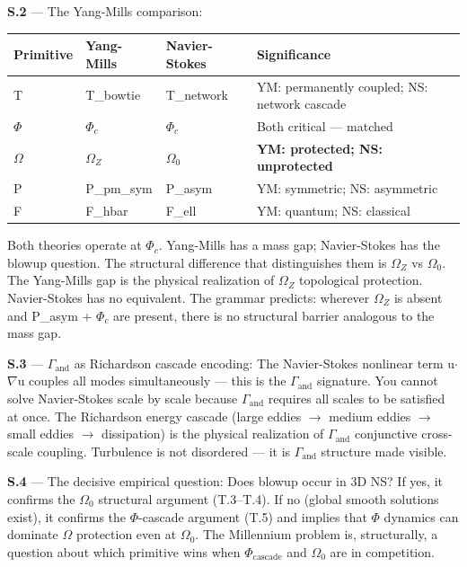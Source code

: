 \documentclass[11pt,a4paper]{article}
\begin{document}
\textbf{S.2} --- The Yang-Mills comparison:

\begin{table}[htbp]
\centering
\small
{}
\begin{tabularx}{\textwidth}{>{\centering\arraybackslash}X >{\centering\arraybackslash}X >{\centering\arraybackslash}X >{\centering\arraybackslash}X}
\toprule
\rowcolor{gray!25}\textbf{Primitive} & \textbf{Yang-Mills} & \textbf{Navier-Stokes} & \textbf{Significance} \\
\midrule
\rowcolors{1}{white}{gray!10}
T & T\_bowtie & T\_network & YM: permanently coupled; NS: network cascade \\
$\Phi$ & $\Phi_c$ & $\Phi_c$ & Both critical --- matched \\
\textbf{$\Omega$} & \textbf{$\Omega_Z$} & \textbf{$\Omega_0$} & \textbf{YM: protected; NS: unprotected} \\
P & P\_pm\_sym & P\_asym & YM: symmetric; NS: asymmetric \\
F & F\_hbar & F\_ell & YM: quantum; NS: classical \\
\bottomrule
\end{tabularx}
\end{table}

Both theories operate at $\Phi_c$. Yang-Mills has a mass gap; Navier-Stokes has the blowup question. The structural difference that distinguishes them is $\Omega_Z$ vs $\Omega_0$. The Yang-Mills gap is the physical realization of $\Omega_Z$ topological protection. Navier-Stokes has no equivalent. The grammar predicts: wherever $\Omega_Z$ is absent and P\_asym + $\Phi_c$ are present, there is no structural barrier analogous to the mass gap.

\textbf{S.3} --- $\Gamma_\text{and}$ as Richardson cascade encoding: The Navier-Stokes nonlinear term u$\cdot$$\nabla$u couples all modes simultaneously --- this is the $\Gamma_\text{and}$ signature. You cannot solve Navier-Stokes scale by scale because $\Gamma_\text{and}$ requires all scales to be satisfied at once. The Richardson energy cascade (large eddies $\to$ medium eddies $\to$ small eddies $\to$ dissipation) is the physical realization of $\Gamma_\text{and}$ conjunctive cross-scale coupling. Turbulence is not disordered --- it is $\Gamma_\text{and}$ structure made visible.

\textbf{S.4} --- The decisive empirical question: Does blowup occur in 3D NS? If yes, it confirms the $\Omega_0$ structural argument (T.3--T.4). If no (global smooth solutions exist), it confirms the $\Phi$-cascade argument (T.5) and implies that $\Phi$ dynamics can dominate $\Omega$ protection even at $\Omega_0$. The Millennium problem is, structurally, a question about which primitive wins when $\Phi_\text{cascade}$ and $\Omega_0$ are in competition.
\end{document}
